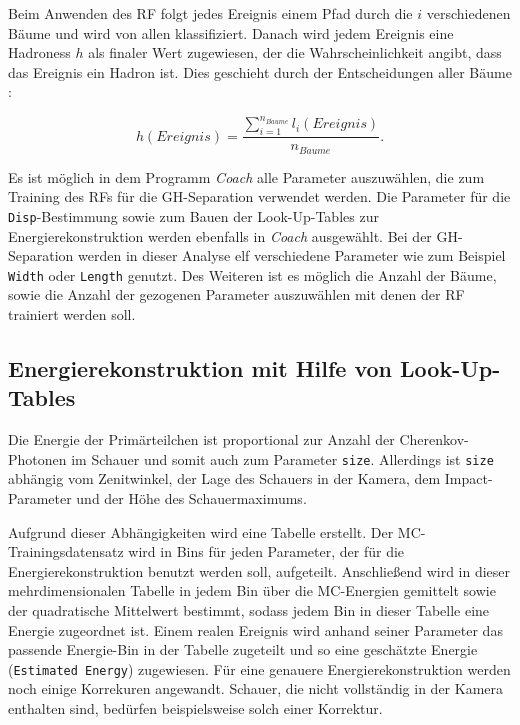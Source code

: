 Beim Anwenden des RF folgt jedes Ereignis einem Pfad durch die $i$ verschiedenen Bäume und wird von allen klassifiziert.
Danach wird jedem Ereignis eine Hadroness $h$ als finaler Wert zugewiesen, der die Wahrscheinlichkeit angibt, dass das Ereignis ein Hadron ist.
Dies geschieht durch der Entscheidungen aller Bäume \cite{RandomForestForMAGIC}: 

\begin{equation}
 h(Ereignis)=\frac{ \sum_{i=1} ^{n_{B\ddot{a}ume}} l_i(Ereignis)}{n_{B\ddot{a}ume}}.
\end{equation}

Es ist möglich in dem Programm \textit{Coach} alle Parameter auszuwählen, die zum Training des RFs für die GH-Separation verwendet werden.
Die Parameter für die \texttt{Disp}-Bestimmung sowie zum Bauen der Look-Up-Tables zur Energierekonstruktion werden ebenfalls in \textit{Coach} ausgewählt.
Bei der GH-Separation werden in dieser Analyse elf verschiedene Parameter wie zum Beispiel \texttt{Width} oder \texttt{Length} genutzt.
Des Weiteren ist es möglich die Anzahl der Bäume, sowie die Anzahl der gezogenen Parameter auszuwählen mit denen der RF trainiert werden soll.

\subsection{Energierekonstruktion mit Hilfe von Look-Up-Tables}
Die Energie der Primärteilchen ist proportional zur Anzahl der Cherenkov-Photonen im Schauer und somit auch zum Parameter \texttt{size}.
Allerdings ist \texttt{size} abhängig vom Zenitwinkel, der Lage des Schauers in der Kamera, dem Impact-Parameter und der Höhe des Schauermaximums.\cite{EnergieRekonstruktion}

Aufgrund dieser Abhängigkeiten wird eine Tabelle erstellt.
Der MC-Trainingsdatensatz wird in Bins für jeden Parameter, der für die Energierekonstruktion benutzt werden soll, aufgeteilt.
Anschließend wird in dieser mehrdimensionalen Tabelle in jedem Bin über die MC-Energien gemittelt sowie der quadratische Mittelwert bestimmt, sodass jedem Bin in dieser Tabelle eine Energie zugeordnet ist.
Einem realen Ereignis wird anhand seiner Parameter das passende Energie-Bin in der Tabelle zugeteilt und so eine geschätzte Energie (\texttt{Estimated Energy}) zugewiesen.
Für eine genauere Energierekonstruktion werden noch einige Korrekuren angewandt.
Schauer, die nicht vollständig in der Kamera enthalten sind, bedürfen beispielsweise solch einer Korrektur.\cite{EnergieRekonstruktion}

